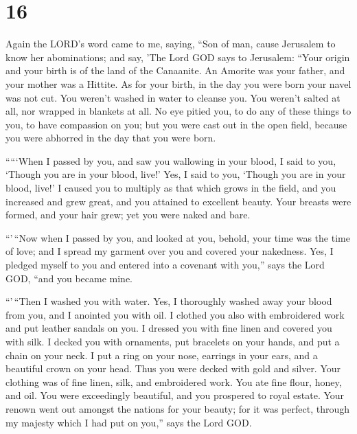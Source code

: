 \hypertarget{section-14}{%
\section{16}\label{section-14}}

 Again the LORD's word came to me, saying, 
``Son of man, cause Jerusalem to know her abominations;  and
say, 'The Lord GOD says to Jerusalem: ``Your origin and your birth is of
the land of the Canaanite. An Amorite was your father, and your mother
was a Hittite.  As for your birth, in the day you were born
your navel was not cut. You weren't washed in water to cleanse you. You
weren't salted at all, nor wrapped in blankets at all.  No
eye pitied you, to do any of these things to you, to have compassion on
you; but you were cast out in the open field, because you were abhorred
in the day that you were born.

 `````When I passed by you, and saw you wallowing in your
blood, I said to you, `Though you are in your blood, live!' Yes, I said
to you, `Though you are in your blood, live!'  I caused you
to multiply as that which grows in the field, and you increased and grew
great, and you attained to excellent beauty. Your breasts were formed,
and your hair grew; yet you were naked and bare.

 ``'\,``Now when I passed by you, and looked at you, behold,
your time was the time of love; and I spread my garment over you and
covered your nakedness. Yes, I pledged myself to you and entered into a
covenant with you,'' says the Lord GOD, ``and you became mine.

 ``'\,``Then I washed you with water. Yes, I thoroughly
washed away your blood from you, and I anointed you with oil.
 I clothed you also with embroidered work and put leather
sandals on you. I dressed you with fine linen and covered you with silk.
 I decked you with ornaments, put bracelets on your hands,
and put a chain on your neck.  I put a ring on your nose,
earrings in your ears, and a beautiful crown on your head. 
Thus you were decked with gold and silver. Your clothing was of fine
linen, silk, and embroidered work. You ate fine flour, honey, and oil.
You were exceedingly beautiful, and you prospered to royal estate.
 Your renown went out amongst the nations for your beauty;
for it was perfect, through my majesty which I had put on you,'' says
the Lord GOD.

